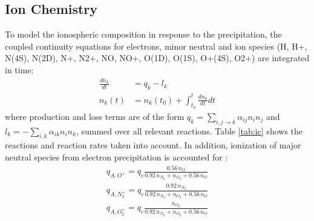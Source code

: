 \documentclass[10pt, a4paper]{article}
\numberwithin{equation}{section}										%
\begin{document}
\subsection{Ion Chemistry}
To model the ionospheric composition in response to the precipitation, the coupled continuity equations for electrons, minor neutral and ion species (H, H+, N(4S), N(2D), N+, N2+, NO, NO+, O(1D), O(1S), O+(4S), O2+) are integrated in time:
\begin{align}
	\frac{dn_k}{dt} &= q_k - l_k\\
	\label{eq:ode}
	n_k(t) &= n_k(t_0) + \int_{t_0}^t \frac{dn_k}{dt} dt
\end{align}
where production and loss terms are of the form $q_k = \sum_{i, j \rightarrow k} \alpha_{ij} n_i n_j$ and $l_k = -\sum_{i, k} \alpha_{ik} n_i n_k$, summed over all relevant reactions. Table \ref{tab:ic} shows the reactions and reaction rates taken into account. In addition, ionization of major neutral species from electron precipitation is accounted for \cite{rees_physics_1989}:
\begin{align}
	q_{A, O^+}  = q_e \frac {0.56 \, n_O}{0.92\, n_{N_2} + n_{O_2} + 0.56\, n_O}\\
	q_{A, N_2^+} = q_e \frac {0.92\, n_{N_2}}{0.92\, n_{N_2} + n_{O_2} + 0.56 \,n_O}\\
	q_{A, O_2^+} = q_e \frac {n_{O_2}}{0.92\, n_{N_2} + n_{O_2} + 0.56\, n_O}
\end{align}
%
\end{document}
